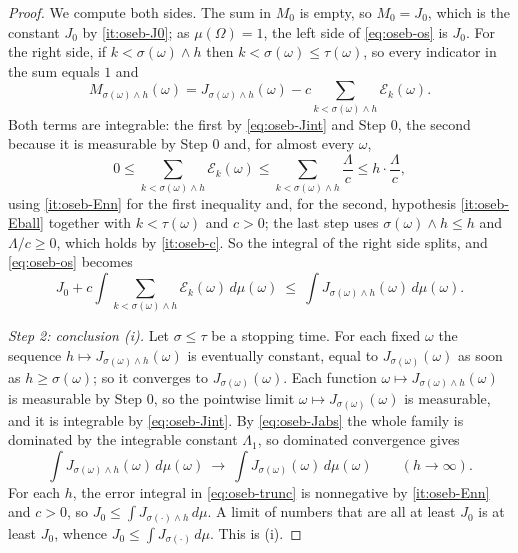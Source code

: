 \begin{proof}
We compute both sides. The sum in $M_0$ is empty, so $M_0=J_0$, which is the
constant $J_0$ by \ref{it:oseb-J0}; as $\mu(\Omega)=1$, the left side of
\eqref{eq:oseb-os} is $J_0$. For the right side, if $k<\sigma(\omega)\wedge h$
then $k<\sigma(\omega)\le\tau(\omega)$, so every indicator in the sum equals
$1$ and
\[
  M_{\sigma(\omega)\wedge h}(\omega)
   =J_{\sigma(\omega)\wedge h}(\omega)
     -c\sum_{k<\sigma(\omega)\wedge h}\mathcal E_k(\omega).
\]
Both terms are integrable: the first by \eqref{eq:oseb-Jint} and Step 0, the
second because it is measurable by Step 0 and, for almost every $\omega$,
\[
  0\le\sum_{k<\sigma(\omega)\wedge h}\mathcal E_k(\omega)
   \le\sum_{k<\sigma(\omega)\wedge h}\frac{\Lambda}{c}
   \le h\cdot\frac{\Lambda}{c},
\]
using \ref{it:oseb-Enn} for the first inequality and, for the second,
hypothesis \ref{it:oseb-Eball} together with $k<\tau(\omega)$ and $c>0$; the
last step uses $\sigma(\omega)\wedge h\le h$ and $\Lambda/c\ge0$, which holds
by \ref{it:oseb-c}. So the integral of the right side splits, and
\eqref{eq:oseb-os} becomes
\begin{equation}\label{eq:oseb-trunc}
  J_0+c\int\sum_{k<\sigma(\omega)\wedge h}\mathcal E_k(\omega)\,d\mu(\omega)
   \ \le\ \int J_{\sigma(\omega)\wedge h}(\omega)\,d\mu(\omega).
\end{equation}

\emph{Step 2: conclusion (i).} Let $\sigma\le\tau$ be a stopping time. For each
fixed $\omega$ the sequence $h\mapsto J_{\sigma(\omega)\wedge h}(\omega)$ is
eventually constant, equal to $J_{\sigma(\omega)}(\omega)$ as soon as
$h\ge\sigma(\omega)$; so it converges to $J_{\sigma(\omega)}(\omega)$. Each
function $\omega\mapsto J_{\sigma(\omega)\wedge h}(\omega)$ is measurable by
Step 0, so the pointwise limit $\omega\mapsto J_{\sigma(\omega)}(\omega)$ is
measurable, and it is integrable by \eqref{eq:oseb-Jint}. By
\eqref{eq:oseb-Jabs} the whole family is dominated by the integrable constant
$\Lambda_1$, so dominated convergence gives
\[
  \int J_{\sigma(\omega)\wedge h}(\omega)\,d\mu(\omega)
   \ \longrightarrow\ \int J_{\sigma(\omega)}(\omega)\,d\mu(\omega)
  \qquad(h\to\infty).
\]
For each $h$, the error integral in \eqref{eq:oseb-trunc} is nonnegative by
\ref{it:oseb-Enn} and $c>0$, so $J_0\le\int J_{\sigma(\cdot)\wedge h}\,d\mu$.
A limit of numbers that are all at least $J_0$ is at least $J_0$, whence
$J_0\le\int J_{\sigma(\cdot)}\,d\mu$. This is (i).


\end{proof}
